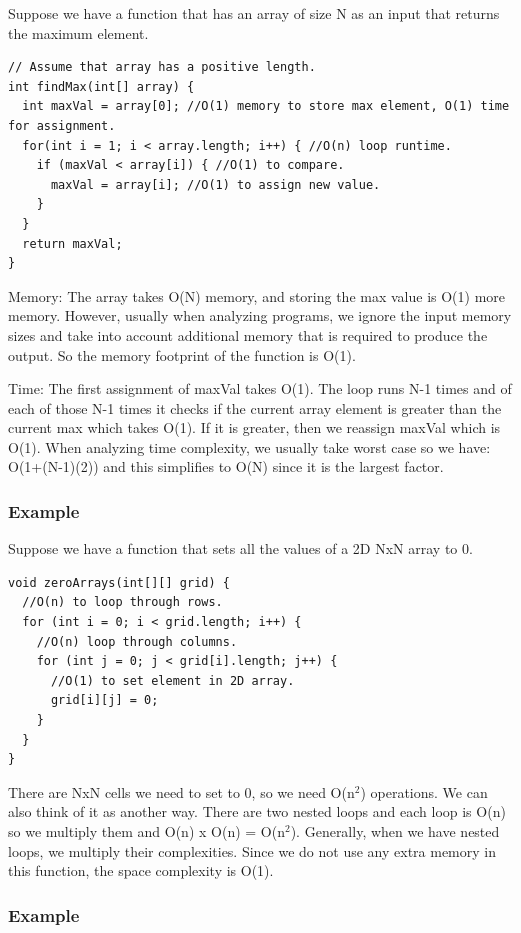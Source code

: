 \documentclass[11pt,oneside]{book}
\begin{document}
Suppose we have a function that has an array of size N as an input that returns the maximum element.

\begin{lstlisting}
// Assume that array has a positive length.
int findMax(int[] array) {
  int maxVal = array[0]; //O(1) memory to store max element, O(1) time for assignment.
  for(int i = 1; i < array.length; i++) { //O(n) loop runtime.
    if (maxVal < array[i]) { //O(1) to compare.
      maxVal = array[i]; //O(1) to assign new value.
    }
  }
  return maxVal;
}
\end{lstlisting}

Memory: The array takes O(N) memory, and storing the max value is O(1) more memory. However, usually when analyzing programs, we ignore the input memory sizes and take into account additional memory that is required to produce the output. So the memory footprint of the function is O(1).

Time: The first assignment of maxVal takes O(1). The loop runs N-1 times and of each of those N-1 times it checks if the current array element is greater than the current max which takes O(1). If it is greater, then we reassign maxVal which is O(1). When analyzing time complexity, we usually take worst case so we have: O(1+(N-1)(2)) and this simplifies to O(N) since it is the largest factor.

\subsubsection{Example}

Suppose we have a function that sets all the values of a 2D NxN array to 0.

\begin{lstlisting}
void zeroArrays(int[][] grid) {
  //O(n) to loop through rows.
  for (int i = 0; i < grid.length; i++) {
    //O(n) loop through columns.
    for (int j = 0; j < grid[i].length; j++) {
      //O(1) to set element in 2D array.
      grid[i][j] = 0;
    }
  }
}
\end{lstlisting}

There are NxN cells we need to set to 0, so we need O(n$^{2}$) operations. We can also think of it as another way. There are two nested loops and each loop is O(n) so we multiply them and O(n) x O(n) = O(n$^{2}$). Generally, when we have nested loops, we multiply their complexities. Since we do not use any extra memory in this function, the space complexity is O(1).

\subsubsection{Example}
\end{document}
